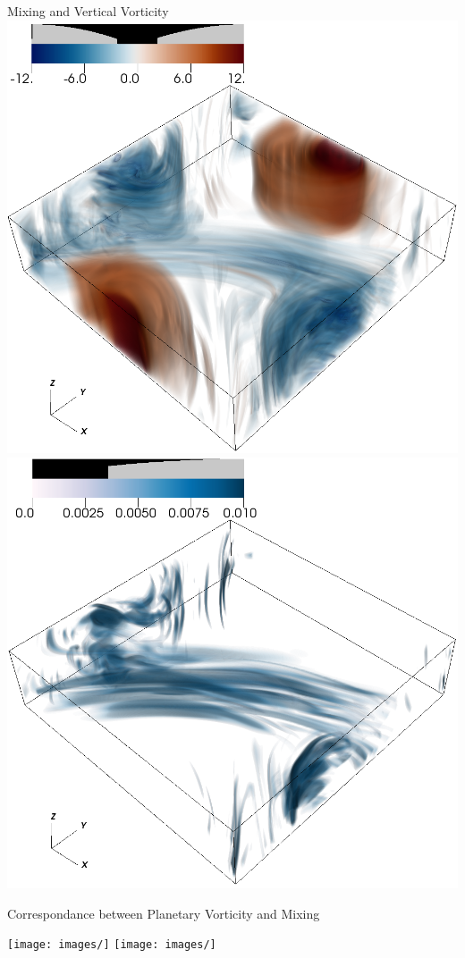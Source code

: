 \documentclass{beamer}
\begin{document}
\begin{frame}{Mixing and Vertical Vorticity}
        \includegraphics[width=.95\textwidth]{images/vortz_Om10_vr2.png}
        \includegraphics[width=.95\textwidth]{images/chi_Om10_vr2.png}
    \emp

\end{frame}

\begin{frame}{Correspondance between Planetary Vorticity and Mixing}

    \texttt{[image: images/]}
    \texttt{[image: images/]}

\end{frame}
\end{document}
